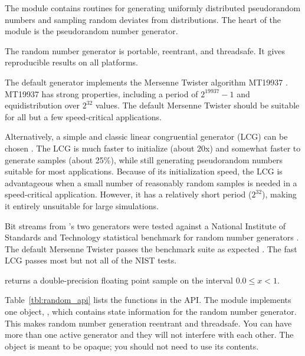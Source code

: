 The  module contains routines for generating uniformly
distributed pseudorandom numbers and sampling random deviates from
distributions. The heart of the module is the 
pseudorandom number generator.

The  random number generator is portable,
reentrant, and threadsafe. It gives reproducible results on all
platforms.

The default  generator implements the Mersenne
Twister algorithm MT19937 \citep{Matsumoto98}. MT19937 has strong
properties, including a period of $2^{19937}-1$ and equidistribution
over $2^{32}$ values. The default Mersenne Twister should be suitable
for all but a few speed-critical applications.

Alternatively, a simple and classic linear congruential generator
(LCG) can be chosen \citep{Knu-81a}. The LCG is much faster to
initialize (about 20x) and somewhat faster to generate samples (about
25\%), while still generating pseudorandom numbers suitable for most
applications. Because of its initialization speed, the LCG is
advantageous when a small number of reasonably random samples is
needed in a speed-critical application. However, it has a relatively
short period ($2^32$), making it entirely unsuitable for large
simulations.

Bit streams from 's two generators were tested
against a National Institute of Standards and Technology statistical
benchmark for random number generators \citep{NIST08}.  The default
Mersenne Twister passes the benchmark suite as expected
\citep{Matsumoto98}. The fast LCG passes most but not all of the NIST
tests.

 returns a double-precision floating point sample
on the interval $0.0 \leq x < 1$. 

Table~\ref{tbl:random_api} lists the functions in the 
API. The module implements one object, , which
contains state information for the random number generator.  This
makes random number generation reentrant and threadsafe. You can have
more than one active generator and they will not interfere with each
other. The object is meant to be opaque; you should not need to use
its contents.  

